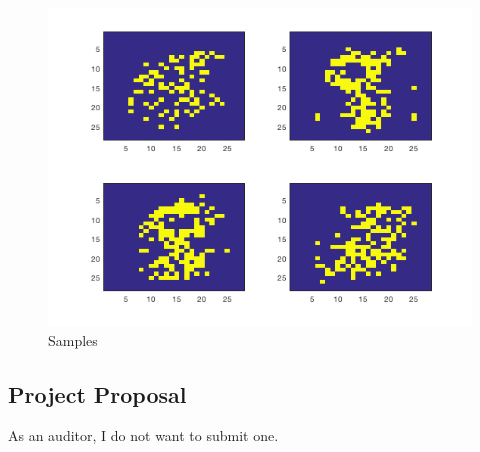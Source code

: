 \documentclass{article}
\begin{document}
\begin{enumerate}
\begin{figure}[!ht]
\centering
\includegraphics[scale=0.5]{./a3/Samples.png}
\caption{Samples}
\label{Samples}
\end{figure}

\end{enumerate}

\newpage
\newpage

\subsection{Project Proposal}

As an auditor, I do not want to submit one.
\end{document}
